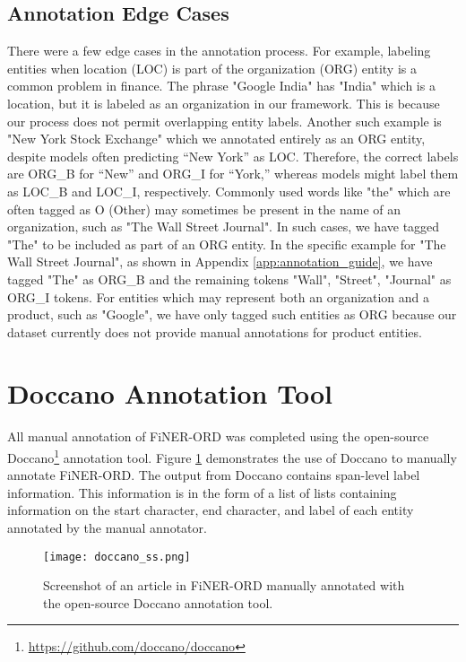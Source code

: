 \documentclass[11pt]{article}
\begin{document}
\subsection{Annotation Edge Cases}
There were a few edge cases in the annotation process. For example, labeling entities when location (LOC) is part of the organization (ORG) entity is a common problem in finance. The phrase "Google India" has "India" which is a location, but it is labeled as an organization in our framework. This is because our process does not permit overlapping entity labels. Another such example is "New York Stock Exchange" which we annotated entirely as an ORG entity, despite models often predicting “New York” as LOC. Therefore, the correct labels are ORG\_B for “New” and ORG\_I for “York,” whereas models might label them as LOC\_B and LOC\_I, respectively. Commonly used words like "the" which are often tagged as O (Other) may sometimes be present in the name of an organization, such as "The Wall Street Journal". In such cases, we have tagged "The" to be included as part of an ORG entity. In the specific example for "The Wall Street Journal", as shown in Appendix \ref{app:annotation_guide}, we have tagged "The" as ORG\_B and the remaining tokens "Wall", "Street", "Journal" as ORG\_I tokens. For entities which may represent both an organization and a product, such as "Google", we have only tagged such entities as ORG because our dataset currently does not provide manual annotations for product entities.

\section{Doccano Annotation Tool}
\label{app:annotation_tool}
All manual annotation of FiNER-ORD was completed using the open-source Doccano\footnote{\url{https://github.com/doccano/doccano}} annotation tool. Figure \ref{fig:doccano_ss} demonstrates the use of Doccano to manually annotate FiNER-ORD. The output from Doccano contains span-level label information. This information is in the form of a list of lists containing information on the start character, end character, and label of each entity annotated by the manual annotator.

\begin{figure}[h]
    \centering
        \texttt{[image: doccano\_ss.png]}
    \caption{Screenshot of an article in FiNER-ORD manually annotated with the open-source Doccano annotation tool.}
    \label{fig:doccano_ss}
\end{figure}
\end{document}
